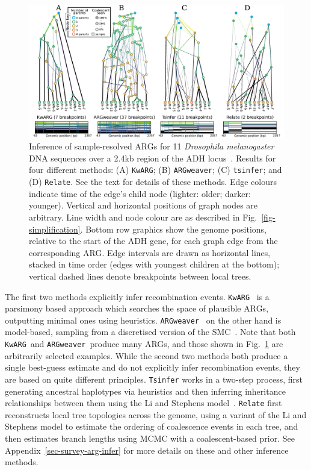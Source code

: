 \documentclass{article}
\newcommand{\tsinfer}[0]{\texttt{tsinfer}}
\newcommand{\kwarg}[0]{\texttt{KwARG}}
\newcommand{\argweaver}[0]{\texttt{ARGweaver}}
\newcommand{\relate}[0]{\texttt{Relate}}
\begin{document}
\begin{figure} \begin{center}
\includegraphics[width=\textwidth]{illustrations/inference.pdf} \end{center}
\caption{\label{fig-inferred-args} Inference of sample-resolved ARGs for 11
\textit{Drosophila melanogaster} DNA sequences over a 2.4kb
region of the ADH locus~\citep{kreitman1983nucleotide}.
Results for four different methods:
(A) \kwarg; (B) \argweaver; (C) \tsinfer; and (D) \relate. See the
text for details of these methods.
Edge colours indicate time of the edge's child node
(lighter: older; darker: younger).
Vertical and horizontal positions of graph nodes are arbitrary.
Line width and node colour are as described in Fig.~\ref{fig-simplification}.
Bottom row graphics show the genome positions, relative to the start of
the ADH gene, for each graph edge from the corresponding ARG. Edge intervals
are drawn as horizontal lines, stacked in time order (edges with youngest
children at the bottom); vertical dashed lines denote breakpoints between
local trees.
}
\end{figure}

The first two methods explicitly infer recombination events.
\kwarg~\citep{ignatieva2021kwarg} is a parsimony based approach
which searches the space of plausible ARGs,
outputting minimal ones using heuristics.
\argweaver~\citep{rasmussen2014genome} on the other hand is
model-based, sampling from a discretised version of the
SMC~\citep{mcvean2005approximating,marjoram2006fast}.
Note that both \kwarg\ and \argweaver\ produce many ARGs,
and those shown in Fig.~\ref{fig-inferred-args} are arbitrarily selected
examples.
While the second two methods
both produce a single best-guess estimate and
do not explicitly infer recombination events, they are based on
quite different principles.
\texttt{Tsinfer} works in a two-step process, first generating ancestral
haplotypes via heuristics and then inferring inheritance relationships
between them using the Li and Stephens model~\citep{li2003modeling}.
\texttt{Relate} first reconstructs local tree topologies across the genome,
using a variant of the Li and Stephens model to estimate the
ordering of coalescence events in each tree, and then estimates
branch lengths using MCMC with a coalescent-based prior.
See Appendix~\ref{sec-survey-arg-infer} for more details on these
and other inference methods.
\end{document}
